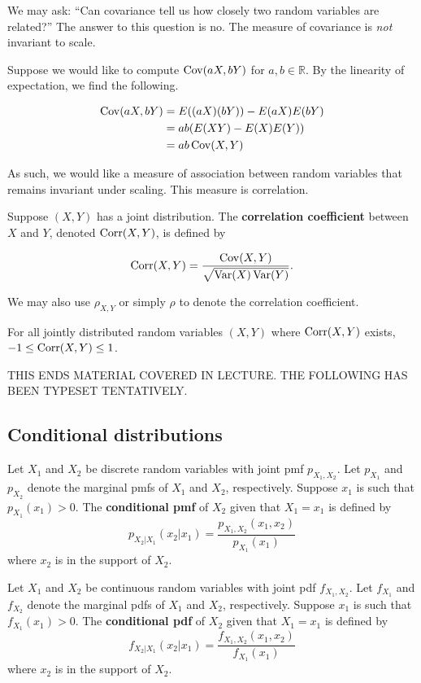We may ask: ``Can covariance tell us how closely two random variables are related?'' The answer to this question is no. The measure of covariance is \textit{not} invariant to scale.

Suppose we would like to compute $\operatorname{Cov}(aX,bY)$ for $a,b\in\mathbb R$. By the linearity of expectation, we find the following.

\begin{align*}
	\operatorname{Cov}(aX,bY)&=E((aX)(bY))-E(aX)E(bY)\\
	&=ab(E(XY)-E(X)E(Y))\\
	&=ab\operatorname{Cov}(X,Y)
\end{align*}

As such, we would like a measure of association between random variables that remains invariant under scaling. This measure is correlation.

\begin{definition}
	Suppose $(X,Y)$ has a joint distribution. The \textbf{correlation coefficient} between $X$ and $Y$, denoted $\operatorname{Corr}(X,Y)$, is defined by

	$$\operatorname{Corr}(X,Y)=\frac{\operatorname{Cov}(X,Y)}{\sqrt{\operatorname{Var}(X)\operatorname{Var}(Y)}}.$$
\end{definition}

We may also use $\rho_{X,Y}$ or simply $\rho$ to denote the correlation coefficient.

\begin{theorem}[]
	For all jointly distributed random variables $(X,Y)$ where $\operatorname{Corr}(X,Y)$ exists, $-1\leq\operatorname{Corr}(X,Y)\leq 1$.
\end{theorem}

THIS ENDS MATERIAL COVERED IN LECTURE. THE FOLLOWING HAS BEEN TYPESET TENTATIVELY.

\subsection{Conditional distributions}

\begin{definition}
	Let $X_1$ and $X_2$ be discrete random variables with joint pmf $p_{X_1,X_2}$. Let $p_{X_1}$ and $p_{X_2}$ denote the marginal pmfs of $X_1$ and $X_2$, respectively. Suppose $x_1$ is such that $p_{X_1}(x_1)>0$. The \textbf{conditional pmf} of $X_2$ given that $X_1=x_1$ is defined by
	$$p_{X_2|X_1}(x_2|x_1)=\frac{p_{X_1,X_2}(x_1,x_2)}{p_{X_1}(x_1)}$$
	where $x_2$ is in the support of $X_2$.
\end{definition}

\begin{definition}
	Let $X_1$ and $X_2$ be continuous random variables with joint pdf $f_{X_1,X_2}$. Let $f_{X_1}$ and $f_{X_2}$ denote the marginal pdfs of $X_1$ and $X_2$, respectively. Suppose $x_1$ is such that $f_{X_1}(x_1)>0$. The \textbf{conditional pdf} of $X_2$ given that $X_1=x_1$ is defined by
	$$f_{X_2|X_1}(x_2|x_1)=\frac{f_{X_1,X_2}(x_1,x_2)}{f_{X_1}(x_1)}$$
	where $x_2$ is in the support of $X_2$.
\end{definition}

